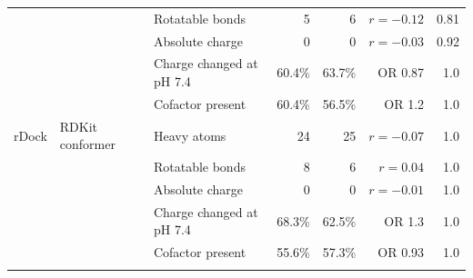 \begin{longtable}{lllrrrr}
 &  & Rotatable bonds & 5 & 6 & $r = -0.12$ & 0.81 \\
 &  & Absolute charge & 0 & 0 & $r = -0.03$ & 0.92 \\
 &  & Charge changed at pH 7.4 & 60.4\% & 63.7\% & OR 0.87 & 1.0 \\
 &  & Cofactor present & 60.4\% & 56.5\% & OR 1.2 & 1.0 \\
\addlinespace
rDock & RDKit conformer & Heavy atoms & 24 & 25 & $r = -0.07$ & 1.0 \\
 &  & Rotatable bonds & 8 & 6 & $r = 0.04$ & 1.0 \\
 &  & Absolute charge & 0 & 0 & $r = -0.01$ & 1.0 \\
 &  & Charge changed at pH 7.4 & 68.3\% & 62.5\% & OR 1.3 & 1.0 \\
 &  & Cofactor present & 55.6\% & 57.3\% & OR 0.93 & 1.0 \\
\addlinespace
\end{longtable}

